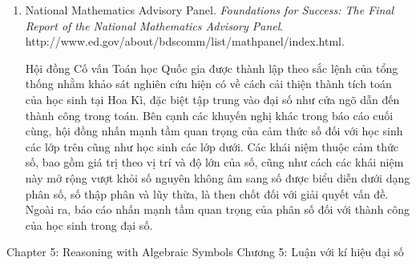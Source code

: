 {{\begin{enumerate}
          \par\noindent\hspace*{1em} Bài tổng quan nghiên cứu về ước lượng toán học và cảm thức số này thảo luận ba mảng liên quan: ước lượng tính toán, ước lượng đo lường và cảm thức số. Chương này lập luận về tầm quan trọng của khả năng ước lượng ở cả trẻ em trong độ tuổi đi học lẫn người lớn, cả trong và ngoài nhà trường. Hiểu sâu về số, bao gồm hiểu độ lớn và so sánh số, cùng với khả năng luận về số, là điều thiết yếu để trở thành người ước lượng tốt.\vspace{3.35\baselineskip}

        \item National Mathematics Advisory Panel. \emph{Foundations for Success: The Final Report of the National Mathematics Advisory Panel}. http://www.ed.gov/about/bdscomm/list/mathpanel/index.html.\vspace{.25\baselineskip}

          \par\noindent\hspace*{1em} Hội đồng Cố vấn Toán học Quốc gia được thành lập theo sắc lệnh của tổng thống nhằm khảo sát nghiên cứu hiện có về cách cải thiện thành tích toán của học sinh tại Hoa Kì, đặc biệt tập trung vào đại số như cửa ngõ dẫn đến thành công trong toán. Bên cạnh các khuyến nghị khác trong báo cáo cuối cùng, hội đồng nhấn mạnh tầm quan trọng của cảm thức số đối với học sinh các lớp trên cũng như học sinh các lớp dưới. Các khái niệm thuộc cảm thức số, bao gồm giá trị theo vị trí và độ lớn của số, cũng như cách các khái niệm này mở rộng vượt khỏi số nguyên không âm sang số được biểu diễn dưới dạng phân số, số thập phân và lũy thừa, là then chốt đối với giải quyết vấn đề. Ngoài ra, báo cáo nhấn mạnh tầm quan trọng của phân số đối với thành công của học sinh trong đại số.
      \end{enumerate}}
  }{\NOTE{}}

\ParallelSection
  {Chapter 5: Reasoning with Algebraic Symbols}
  {Chương 5: Luận với kí hiệu đại số}
  {}

